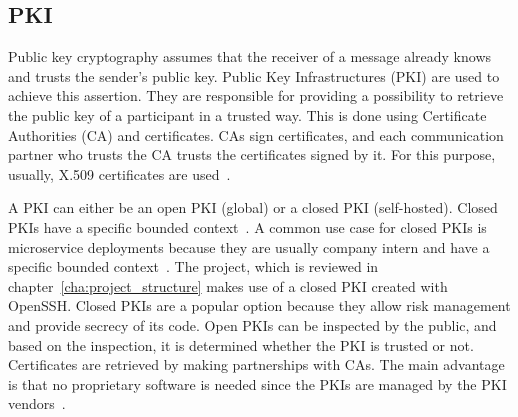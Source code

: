 \subsection{PKI}
Public key cryptography assumes that the receiver of a message already knows and trusts the sender's public key.
Public Key Infrastructures (PKI) are used to achieve this assertion.
They are responsible for providing a possibility to retrieve the public key of a participant in a trusted way.
This is done using Certificate Authorities (CA) and certificates.
CAs sign certificates, and each communication partner who trusts the CA trusts the certificates signed by it.
For this purpose, usually, X.509 certificates are used~\cite{anderson2020security}.

A PKI can either be an open PKI (global) or a closed PKI (self-hosted).
Closed PKIs have a specific bounded context~\cite{hlavaty2003risk}.
A common use case for closed PKIs is microservice deployments because they are usually company intern and have a specific bounded context~\cite{dias2020microservices}.
The project, which is reviewed in chapter~\ref{cha:project_structure} makes use of a closed PKI created with OpenSSH.
Closed PKIs are a popular option because they allow risk management and provide secrecy of its code.
Open PKIs can be inspected by the public, and based on the inspection, it is determined whether the PKI is trusted or not.
Certificates are retrieved by making partnerships with CAs.
The main advantage is that no proprietary software is needed since the PKIs are managed by the PKI vendors~\cite{hlavaty2003risk}.

